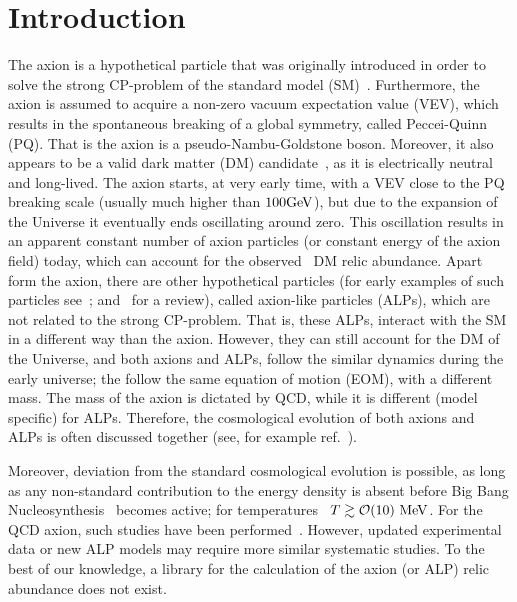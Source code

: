 \documentclass[11pt,a4paper]{article}
\begin{document}
\section{Introduction}\label{sec:intro}
\setcounter{equation}{0}
%
The axion is a hypothetical particle that was originally introduced in order to solve the strong CP-problem of the standard model (SM)~\cite{Peccei:1977hh,Weinberg:1977ma,Wilczek:1977pj}. Furthermore, the axion is assumed to acquire a non-zero vacuum expectation value (VEV), which results in the spontaneous breaking of a global symmetry, called Peccei-Quinn (PQ). That is the axion is a pseudo-Nambu-Goldstone boson.  Moreover, it also appears to be a valid dark matter (DM) candidate~\cite{Preskill:1982cy,Dine:1982ah,Abbott:1982af}, as it is electrically neutral and long-lived.  The axion starts, at very early time, with a VEV close to the PQ breaking scale (usually much higher than $100{\rm GeV}$), but due to the expansion of the Universe it eventually ends oscillating around zero. This oscillation results in an apparent constant number of axion particles (or constant energy of the axion field) today, which can account for the observed~\cite{Planck:2018vyg} DM relic abundance. 
%
Apart form the axion, there are other hypothetical particles (for early examples of such particles see~\cite{Chikashige:1980ui,Georgi:1981pu}; and~\cite{Ringwald:2014vqa} for a review), called axion-like particles (ALPs), which are not related to the strong CP-problem. That is, these ALPs, interact with the SM in a different way than the axion. However, they can still account for the DM of the Universe, and both axions and ALPs, follow the similar dynamics during the early universe; the follow the same equation of motion (EOM), with a different mass. The mass of the axion is dictated by QCD, while it is different (model specific) for ALPs.  Therefore, the cosmological evolution of both axions and ALPs is often discussed together (see, for example ref.~\cite{MARSH20161}). 

Moreover, deviation from the standard cosmological evolution is possible, as long as any non-standard contribution to the energy density is absent before Big Bang Nucleosynthesis~\cite{Kolb:206230,Peebles:1993} becomes active; for temperatures~\cite{Kawasaki:2000en, Hannestad:2004px, Ichikawa:2005vw, DeBernardis:2008zz} $T\gtrsim \mathcal{O}(10)~{\rm MeV}$. For the QCD axion, such studies have been performed~\cite{Visinelli:2009kt, Arias:2021rer}. However, updated experimental data or new ALP models may require more similar systematic studies. To the best of our knowledge, a library for the calculation of the axion (or ALP) relic abundance does not exist. 
\end{document}
